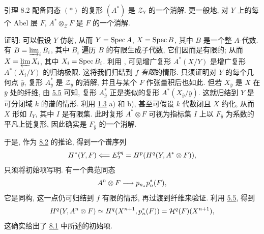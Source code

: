 \begin{enonce*}{引理 8.2}
配备同态 $(\ast)$ 的复形 $(A^{\ast})$ 是 $𝒵_Y$ 的一个消解.
更一般地, 对 $Y$ 上的每个 Abel 层 $F$,
$A^{\ast} \otimes_{𝒵}F$ 是 $F$ 的一个消解.
\end{enonce*}

\noindent
证明: 可以假设 $Y$ 仿射,
从而 $Y = \operatorname{Spec} A$, $X = \operatorname{Spec} B$, 其中 $B$ 是一个整 $A$-代数.
有 $B = \varinjlim_i B_i$, 其中 $B_i$ 遍历 $B$ 的有限生成子代数,
它们因而是有限的;
从而 $X=\varprojlim X_{i}$, 其中 $X_{i}=\operatorname{Spec} B_{i}$.
利用 ,
可见增广复形 $A^{\ast}(X/Y)$ 是增广复形 $A^{\ast}(X_{i}/Y)$ 的归纳极限.
这将我们归结到 $f$ \emph{有限}的情形.
只须证明对 $Y$ 的每个几何点 $\bar{y}$,
复形 $A^{\ast}_{\bar y}$ 是 $𝒵_{\bar{y}}$ 的消解,
并且与某个 $F$ 作张量积后也如此.
但若 $X_{\bar{y}}$ 是 $X$ 在 $\bar{y}$ 处的纤维,
由 \hyperref[VIII.prop5.5]{5.5} 可知,
复形 $A^{\ast}_{\bar{y}}$ 正是类似的复形 $A^{\ast}(X_{\bar{y}}/\bar{y})$.
这就归结到 $Y$ 是可分闭域 $k$ 的谱的情形.
利用 \hyperref[VIII.exem1.3]{1.3} a) 和 b),
甚至可假设 $k$ 代数闭且 $X$ 约化,
从而 $X$ 形如 $I_{Y}$, 其中 $I$ 是有限集.
此时复形 $A^{\ast}\otimes F$ 可视为指标集 $I$ 上以 $F_{\bar{y}}$ 为系数的平凡上链复形,
因此确实是 $F_{\bar{y}}$ 的一个消解.

于是, 作为 \hyperref[VIII.lem8.2]{8.2} 的推论, 得到一个谱序列
$$
H^{\ast}(Y,F)\Longleftarrow E^{pq}_{2}=H^{p}(H^{q}(Y,A^{\ast}\otimes
F)){},
$$
只须将初始项写明. 有一个典范同态\pageoriginale
$$
A^{n}\otimes F\longrightarrow p_{n_{\ast}}p^{\ast}_{n}(F){},
$$
它是同构, 这一点仍可归结到 $f$ 有限的情形, 再过渡到纤维来验证.
利用 \hyperref[VIII.prop5.5]{5.5}, 得到
$$
H^{q}(Y,A^{n}\otimes F)\simeq
H^{q}(X^{n+1},p^{\ast}_{n}(F))=
{\mathcal H}^{q}(F)(X^{n+1}){},
$$
这确实给出了 \hyperref[VIII.prop8.1]{8.1} 中所述的初始项.

